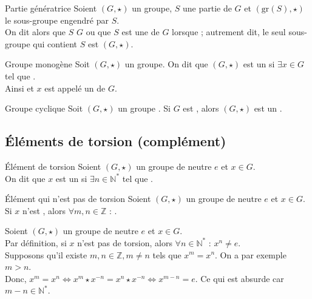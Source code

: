 \documentclass[12pt,a4paper]{report}
\begin{document}
    \begin{definition}{Partie génératrice}{}
    Soient $(G, \star)$ un groupe, $S$ une partie de $G$ et $(\text{gr}(S), \star)$ le sous-groupe engendré par $S$.\\
    On dit alors que $S$  $G$ ou que $S$ est une  de $G$ lorsque  ; autrement dit, le seul sous-groupe qui contient $S$ est $(G, \star)$.
    \end{definition}
    
    \begin{definition}{Groupe monogène}{}
    Soit $(G, \star)$ un groupe. On dit que $(G, \star)$ est un  si $\exists x \in G$ tel que .\\
    Ainsi  et $x$ est appelé un  de $G$.
    \end{definition}
    
    \begin{definition}{Groupe cyclique}{}
    Soit $(G, \star)$ un groupe . Si $G$ est , alors $(G, \star)$ est un .
    \end{definition}
    
    
    \subsection{Éléments de torsion (complément)}

    \begin{definition}{Élément de torsion}{}
    Soient $(G, \star)$ un groupe de neutre $e$ et $x \in G$.\\
    On dit que $x$ est un  si $\exists n \in \mathbb{N}^*$ tel que .
    \end{definition}
    
    \begin{proposition}{Élément qui n'est pas de torsion}{}
    Soient $(G, \star)$ un groupe de neutre $e$ et $x \in G$.\\
    Si $x$ n'est , alors $\forall m, n \in \mathbb{Z}$ : .
    \end{proposition}
    
    \begin{demo}
    Soient $(G, \star)$ un groupe de neutre $e$ et $x \in G$.\\
    Par définition, si $x$ n'est pas de torsion, alors $\forall n \in \mathbb{N}^*$ : $x^n \neq e$.\\
    Supposons qu'il existe $m, n \in \mathbb{Z}, m \neq n$ tels que $x^m = x^n$. On a par exemple $m > n$.\\
    Donc, $x^m = x^n \Leftrightarrow x^m \star x^{-n} = x^n \star x^{-n} \Leftrightarrow x^{m-n} = e$. Ce qui est absurde car $m-n \in \mathbb{N}^*$.
    \end{demo}
    
\end{document}
